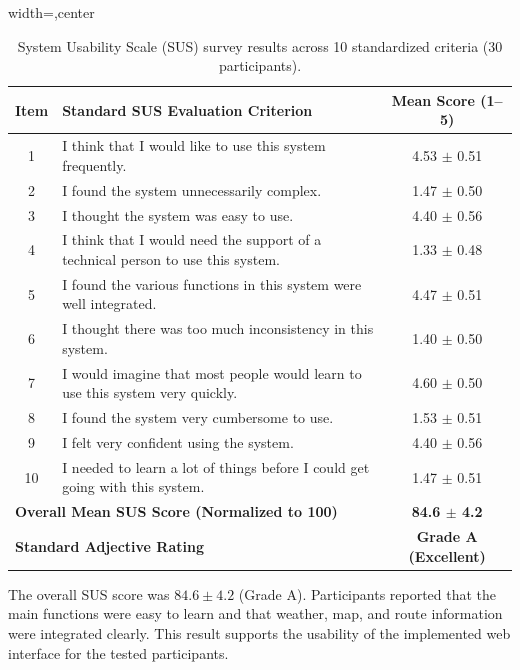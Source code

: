 \begin{table}[H]
\centering
\caption[System Usability Scale survey results across 10 standardized criteria]{System Usability Scale (SUS) survey results across 10 standardized criteria (30 participants).}
\label{tab:sus_evaluation_en}
\begin{adjustbox}{width=\textwidth,center}
\begin{tabular}{clc}
\toprule
\textbf{Item} & \textbf{Standard SUS Evaluation Criterion} & \textbf{Mean Score (1--5)} \\
\midrule
1  & I think that I would like to use this system frequently. & 4.53 $\pm$ 0.51 \\
2  & I found the system unnecessarily complex. & 1.47 $\pm$ 0.50 \\
3  & I thought the system was easy to use. & 4.40 $\pm$ 0.56 \\
4  & I think that I would need the support of a technical person to use this system. & 1.33 $\pm$ 0.48 \\
5  & I found the various functions in this system were well integrated. & 4.47 $\pm$ 0.51 \\
6  & I thought there was too much inconsistency in this system. & 1.40 $\pm$ 0.50 \\
7  & I would imagine that most people would learn to use this system very quickly. & 4.60 $\pm$ 0.50 \\
8  & I found the system very cumbersome to use. & 1.53 $\pm$ 0.51 \\
9  & I felt very confident using the system. & 4.40 $\pm$ 0.56 \\
10 & I needed to learn a lot of things before I could get going with this system. & 1.47 $\pm$ 0.51 \\
\midrule
\multicolumn{2}{l}{\textbf{Overall Mean SUS Score (Normalized to 100)}} & \textbf{84.6 $\pm$ 4.2} \\
\multicolumn{2}{l}{\textbf{Standard Adjective Rating}} & \textbf{Grade A (Excellent)} \\
\bottomrule
\end{tabular}
\end{adjustbox}
\end{table}

The overall SUS score was $84.6 \pm 4.2$ (Grade A). Participants reported that the main functions were easy to learn and that weather, map, and route information were integrated clearly. This result supports the usability of the implemented web interface for the tested participants.


